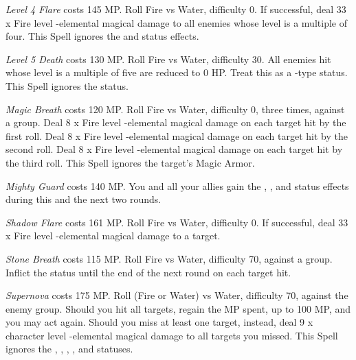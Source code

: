 \begin{multicols}{2}
    \textit{Level 4 Flare} costs 145 MP\@. Roll Fire vs Water, difficulty 0. If successful, deal 33 x Fire level -elemental magical damage to all enemies whose level is a multiple of four. This Spell ignores the  and  status effects.
    
    \textit{Level 5 Death} costs 130 MP\@. Roll Fire vs Water, difficulty 30. All enemies hit whose level is a multiple of five are reduced to 0 HP\@. Treat this as a -type status. This Spell ignores the  status.
    
    \textit{Magic Breath} costs 120 MP\@. Roll Fire vs Water, difficulty 0, three times, against a group. Deal 8 x Fire level -elemental magical damage on each target hit by the first roll. Deal 8 x Fire level -elemental magical damage on each target hit by the second roll. Deal 8 x Fire level -elemental magical damage on each target hit by the third roll. This Spell ignores the target’s Magic Armor.
    
    \textit{Mighty Guard} costs 140 MP\@. You and all your allies gain the , , and  status effects during this and the next two rounds.
    
    \textit{Shadow Flare} costs 161 MP\@. Roll Fire vs Water, difficulty 0. If successful, deal 33 x Fire level -elemental magical damage to a target.
    
    \textit{Stone Breath} costs 115 MP\@. Roll Fire vs Water, difficulty 70, against a group. Inflict the  status until the end of the next round on each target hit.
    
	\textit{Supernova} costs 175 MP\@. Roll (Fire or Water) vs Water, difficulty 70, against the enemy group. Should you hit all targets, regain the MP spent, up to 100 MP, and you may act again. Should you miss at least one target, instead, deal 9 x character level -elemental magical damage to all targets you missed. This Spell ignores the , , , ,  and  statuses.

\end{multicols}
